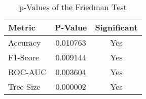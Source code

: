 
    \begin{table}[H]
        \centering
        \renewcommand{\arraystretch}{1.2}
        \caption{p-Values of the Friedman Test}
        \label{tab:RQ_Fitness_friedman}
    \begin{tabular}{lcc}
\toprule
Metric & P-Value & Significant \\
\midrule
Accuracy & 0.010763 & Yes \\
F1-Score & 0.009144 & Yes \\
ROC-AUC & 0.003604 & Yes \\
Tree Size & 0.000002 & Yes \\
\bottomrule
\end{tabular}

        
    \end{table}
    